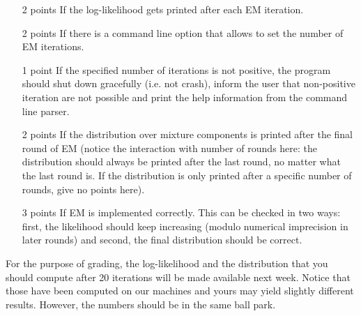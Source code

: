 \documentclass[11pt, leqno, a4paper]{article}
\begin{document}
\begin{itemize}
\item [2 points] If the log-likelihood gets printed after each EM iteration.
\item [2 points] If there is a command line option that allows to set the number of EM iterations.
\item [1 point]  If the specified number of iterations is not positive, the program should shut down gracefully (i.e. not crash), inform the user that non-positive iteration are not possible and print
the help information from the command line parser. 
\item [2 points] If the distribution over mixture components is printed after the final round of EM (notice
the interaction with number of rounds here: the distribution should always be printed after the last round, no matter what the last round is. If the distribution is only printed after a specific number of rounds,
give no points here).
\item[3 points] If EM is implemented correctly. This can be checked in two ways: first, the likelihood
should keep increasing (modulo numerical imprecision in later rounds) and second, the final distribution should be correct.
\end{itemize}

For the purpose of grading, the log-likelihood and the distribution that you should compute after 20 
iterations will be made available next week. Notice that those have been computed on our machines and
yours may yield slightly different results. However, the numbers should be in the same ball park.
\end{document}
